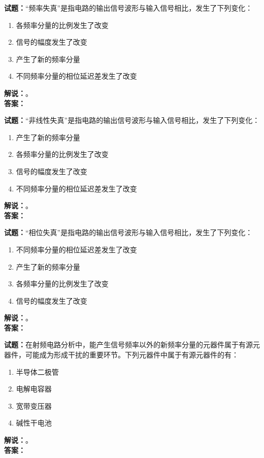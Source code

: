 \documentclass{ctexbook}
\begin{document}
\noindent\textbf{试题：}“频率失真”是指电路的输出信号波形与输入信号相比，发生了下列变化：
\begin{enumerate}[leftmargin=3em]
  \item 各频率分量的比例发生了改变
  \item 信号的幅度发生了改变
  \item 产生了新的频率分量
  \item 不同频率分量的相位延迟差发生了改变
\end{enumerate}
\noindent\textbf{解说：}\textbf{}。\\\noindent\textbf{答案：}

\vspace{\baselineskip}

\noindent\textbf{试题：}“非线性失真”是指电路的输出信号波形与输入信号相比，发生了下列变化：
\begin{enumerate}[leftmargin=3em]
  \item 产生了新的频率分量
  \item 各频率分量的比例发生了改变
  \item 信号的幅度发生了改变
  \item 不同频率分量的相位延迟差发生了改变
\end{enumerate}
\noindent\textbf{解说：}\textbf{}。\\\noindent\textbf{答案：}

\vspace{\baselineskip}

\noindent\textbf{试题：}“相位失真”是指电路的输出信号波形与输入信号相比，发生了下列变化：
\begin{enumerate}[leftmargin=3em]
  \item 不同频率分量的相位延迟差发生了改变
  \item 产生了新的频率分量
  \item 各频率分量的比例发生了改变
  \item 信号的幅度发生了改变
\end{enumerate}
\noindent\textbf{解说：}\textbf{}。\\\noindent\textbf{答案：}

\vspace{\baselineskip}

\noindent\textbf{试题：}在射频电路分析中，能产生信号频率以外的新频率分量的元器件属于有源元器件，可能成为形成干扰的重要环节。下列元器件中属于有源元器件的有：
\begin{enumerate}[leftmargin=3em]
  \item 半导体二极管
  \item 电解电容器
  \item 宽带变压器
  \item 碱性干电池
\end{enumerate}
\noindent\textbf{解说：}\textbf{}。\\\noindent\textbf{答案：}
\end{document}
